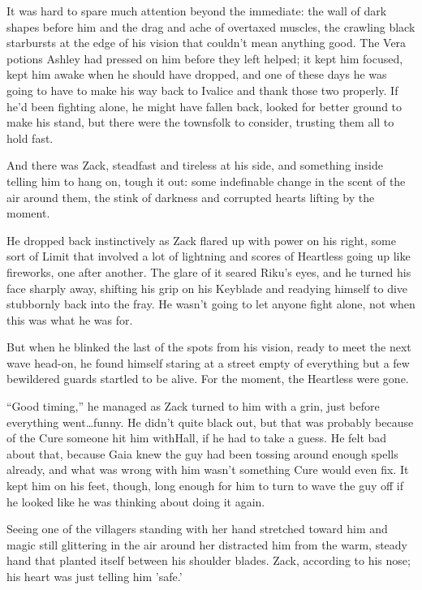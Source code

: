 It was hard to spare much attention beyond the immediate: the wall of dark shapes before him and the drag and ache of overtaxed muscles, the crawling black starbursts at the edge of his vision that couldn't mean anything good. The Vera potions Ashley had pressed on him before they left helped; it kept him focused, kept him awake when he should have dropped, and one of these days he was going to have to make his way back to Ivalice and thank those two properly. If he'd been fighting alone, he might have fallen back, looked for better ground to make his stand, but there were the townsfolk to consider, trusting them all to hold fast.

And there was Zack, steadfast and tireless at his side, and something inside telling him to hang on, tough it out: some indefinable change in the scent of the air around them, the stink of darkness and corrupted hearts lifting by the moment.

He dropped back instinctively as Zack flared up with power on his right, some sort of Limit that involved a lot of lightning and scores of Heartless going up like fireworks, one after another. The glare of it seared Riku's eyes, and he turned his face sharply away, shifting his grip on his Keyblade and readying himself to dive stubbornly back into the fray. He wasn't going to let anyone fight alone, not when this was what he was for.

But when he blinked the last of the spots from his vision, ready to meet the next wave head-on, he found himself staring at a street empty of everything but a few bewildered guards startled to be alive. For the moment, the Heartless were gone.

``Good timing,'' he managed as Zack turned to him with a grin, just before everything went\ldots funny. He didn't quite black out, but that was probably because of the Cure someone hit him with\textemdash Hall, if he had to take a guess. He felt bad about that, because Gaia knew the guy had been tossing around enough spells already, and what was wrong with him wasn't something Cure would even fix. It kept him on his feet, though, long enough for him to turn to wave the guy off if he looked like he was thinking about doing it again.

Seeing one of the villagers standing with her hand stretched toward him and magic still glittering in the air around her distracted him from the warm, steady hand that planted itself between his shoulder blades. Zack, according to his nose; his heart was just telling him 'safe.'

